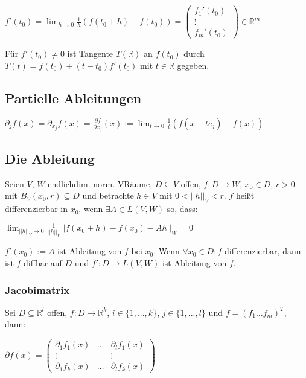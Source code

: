 $f'(t_0) = \displaystyle\lim_{h \to 0} \frac{1}{h} (f(t_0 + h) - f(t_0)) = \begin{pmatrix} f_1'(t_0) \\ \vdots \\ f_m'(t_0)\end{pmatrix} \in \mathbb{R}^m$

Für $f'(t_0) \neq 0$ ist Tangente $T(\mathbb{R})$ an $f(t_0)$ durch $T(t) = f(t_0) + (t - t_0)f'(t_0)$ mit $t \in \mathbb{R}$ gegeben.

\subsection*{Partielle Ableitungen}

$\partial_j f(x) = \partial_{x_j} f(x) = \frac{\partial f}{\partial x_j}(x) := \displaystyle\lim_{t \to 0} \frac{1}{t}(f(x+te_j)-f(x))$

\subsection*{Die Ableitung}

Seien $V$, $W$ endlichdim. norm. VRäume, $D \subseteq V$ offen, $f: D \rightarrow W$, $x_0 \in D$, $r > 0$ mit $B_V(x_0, r) \subseteq D$ und betrachte $h \in V$ mit $0 < ||h||_V < r$. $f$ heißt differenzierbar in $x_0$, wenn $\exists A \in L(V, W)$ so, dass:

$\displaystyle\lim_{||h||_V \to 0} \frac{1}{||h||_V}||f(x_0 + h) - f(x_0) - Ah||_W = 0$

$f'(x_0) := A$ ist Ableitung von $f$ bei $x_0$. Wenn $\forall x_0 \in D : f $ differenzierbar, dann ist $f$ diffbar auf $D$ und $f' : D \rightarrow L(V,W)$ ist Ableitung von $f$.

\subsubsection*{Jacobimatrix}

Sei $D \subseteq \mathbb{R}^l$ offen, $f : D \rightarrow \mathbb{R}^k$, $i \in \{1, ..., k\}$, $j \in \{1, ..., l\}$ und $f = (f_1 \hdots f_m)^T$, dann:

$\partial f(x) = \begin{pmatrix} \partial_1 f_1(x) & \hdots & \partial_l f_1(x) \\ \vdots & & \vdots \\ \partial_1 f_k(x) & \hdots & \partial_l f_k(x) \end{pmatrix}$

